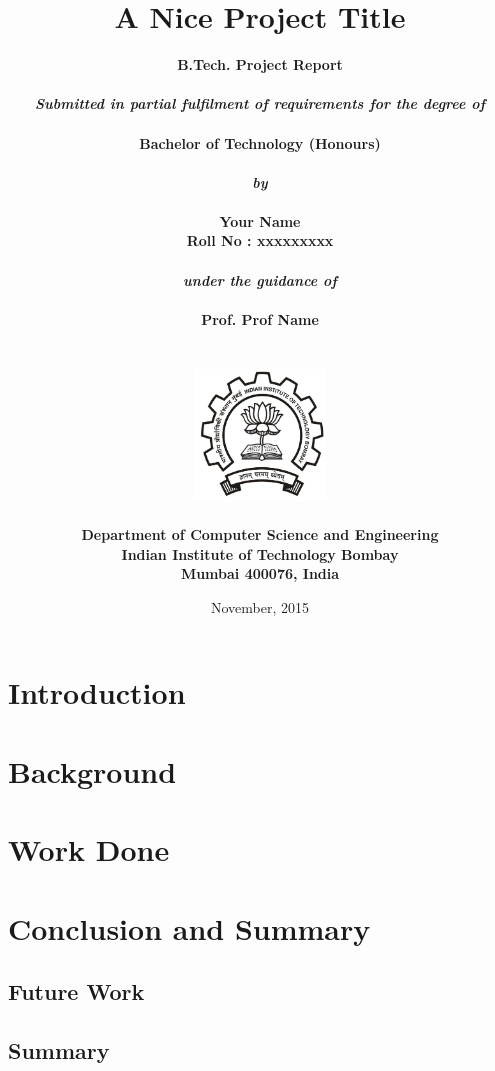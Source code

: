 \documentclass[11pt]{report}
\title{\textbf{A Nice Project Title}}
\author{
		\bf{B.Tech. Project Report}\\
        \\
        \emph{Submitted in partial fulfilment of requirements for the degree of}\\
        \\
        \bf{Bachelor of Technology (Honours)}\\
        \\
        \emph{by}\\
        \\
		\bf{Your Name}\\
        \bf{Roll No : xxxxxxxxx}\\
        \\
        \emph{under the guidance of}\\
        \\
		\bf{Prof. Prof Name}\\
        \\\\
        \includegraphics[height=3.5cm]{./iitb_logo.jpg}\\
        \\
		\bf{Department of Computer Science and Engineering}\\
        \bf{Indian Institute of Technology Bombay}\\
        \bf{Mumbai 400076, India}\\
}
\date{November, 2015}
\begin{document}
\maketitle
\pagebreak
\tableofcontents
\pagebreak

\begin{abstract}

\end{abstract}
\pagebreak

\chapter*{Introduction}


\chapter*{Background}


\chapter*{Work Done}

\chapter*{Conclusion and Summary}

\section*{Future Work}


\section*{Summary}

\begin{thebibliography}{9}

\end{thebibliography}
\end{document}
